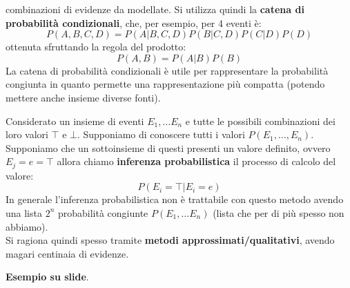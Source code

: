 \message{ !name(modprob.tex)}\documentclass[a4paper,12pt, oneside]{book}
\begin{document}
combinazioni di evidenze da modellate. Si utilizza quindi la \textbf{catena di
  probabilità condizionali}, che, per esempio, per 4 eventi è:
\[P(A,B,C,D)=P(A|B,C,D)P(B|C,D)P(C|D)P(D)\]
ottenuta sfruttando la regola del prodotto:
\[P(A,B)=P(A|B)P(B)\]
La catena di probabilità condizionali è utile per rappresentare la probabilità
congiunta in quanto permette una rappresentazione più compatta (potendo mettere
anche insieme diverse fonti).\\
\begin{definizione}
  Considerato un insieme di eventi $E_1,\ldots E_n$ e tutte le possibili
  combinazioni dei loro valori $\top$ e $\bot$. Supponiamo di conoscere tutti i
  valori $P(E_1,\ldots,E_n)$.  Supponiamo che un sottoinsieme di questi presenti
  un valore definito, ovvero $E_j=e=\top$ allora chiamo \textbf{inferenza
    probabilistica} il processo di calcolo del valore:\\
  \[P(E_i=\top|E_i=e)\]
  In generale l'inferenza probabilistica non è trattabile con questo metodo
  avendo una lista $2^n$ probabilità congiunte $P(E_1,\ldots E_n)$ (lista che
  per di più spesso non abbiamo).\\
  Si ragiona quindi spesso tramite \textbf{metodi approssimati/qualitativi},
  avendo magari centinaia di evidenze.
\end{definizione}
\textbf{Esempio su slide}.\\
\end{document}
